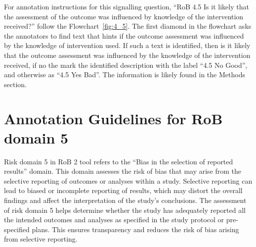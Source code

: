 \documentclass[sn-mathphys,Numbered]{sn-jnl}%
\begin{document}
For annotation instructions for this signalling question, ``RoB 4.5 Is it likely that the assessment of the outcome was influenced by knowledge of the intervention received?'' follow the Flowchart~\ref{fig:4_5}.
The first diamond in the flowchart asks the annotators to find text that hints if the outcome assessment was influenced by the knowledge of intervention used.
If such a text is identified, then is it likely that the outcome assessment was influenced by the knowledge of the intervention received, if no the mark the identified description with the label ``4.5 No Good'', and otherwise as ``4.5 Yes Bad''.
The information is likely found in the Methods section.

%
%
%
\section*{Annotation Guidelines for RoB domain 5}
\label{sec:dom5}
%
Risk domain 5 in RoB 2 tool refers to the ``Bias in the selection of reported results'' domain.
This domain assesses the risk of bias that may arise from the selective reporting of outcomes or analyses within a study.
Selective reporting can lead to biased or incomplete reporting of results, which may distort the overall findings and affect the interpretation of the study's conclusions.
The assessment of risk domain 5 helps determine whether the study has adequately reported all the intended outcomes and analyses as specified in the study protocol or pre-specified plans.
This ensures transparency and reduces the risk of bias arising from selective reporting.
%
%
%
\end{document}

